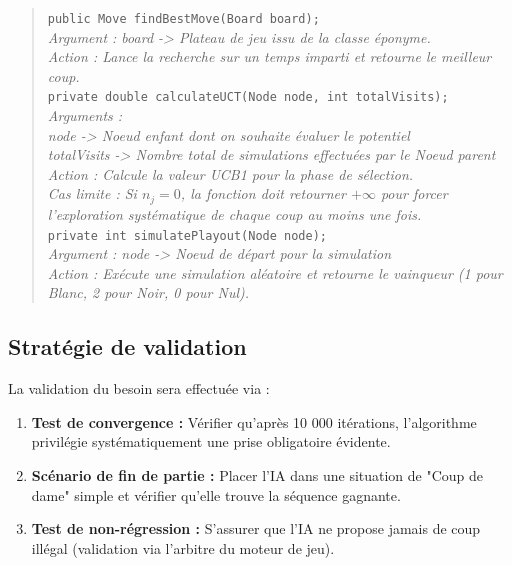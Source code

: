 \documentclass[11pt,a4paper]{article}
\begin{document}
\begin{quote}
\texttt{public Move findBestMove(Board board);} \\
\textit{Argument : board -> Plateau de jeu issu de la classe éponyme.} \\
\textit{Action : Lance la recherche sur un temps imparti et retourne le meilleur coup.} \\

\texttt{private double calculateUCT(Node node, int totalVisits);} \\
\textit{Arguments : \\
node -> Noeud enfant dont on souhaite évaluer le potentiel \\
totalVisits -> Nombre total de simulations effectuées par le Noeud parent} \\
\textit{Action : Calcule la valeur UCB1 pour la phase de sélection.} \\
\textit{Cas limite : Si $n_j = 0$, la fonction doit retourner $+\infty$ pour forcer l'exploration systématique de chaque coup au moins une fois.} \\

\texttt{private int simulatePlayout(Node node);} \\
\textit{Argument : node -> Noeud de départ pour la simulation} \\
\textit{Action : Exécute une simulation aléatoire et retourne le vainqueur (1 pour Blanc, 2 pour Noir, 0 pour Nul).}
\end{quote}

\subsection{Stratégie de validation}
La validation du besoin sera effectuée via :
\begin{enumerate}
    \item \textbf{Test de convergence :} Vérifier qu'après 10 000 itérations, l'algorithme privilégie systématiquement une prise obligatoire évidente.
    \item \textbf{Scénario de fin de partie :} Placer l'IA dans une situation de "Coup de dame" simple et vérifier qu'elle trouve la séquence gagnante.
    \item \textbf{Test de non-régression :} S'assurer que l'IA ne propose jamais de coup illégal (validation via l'arbitre du moteur de jeu).
\end{enumerate}
\end{document}
